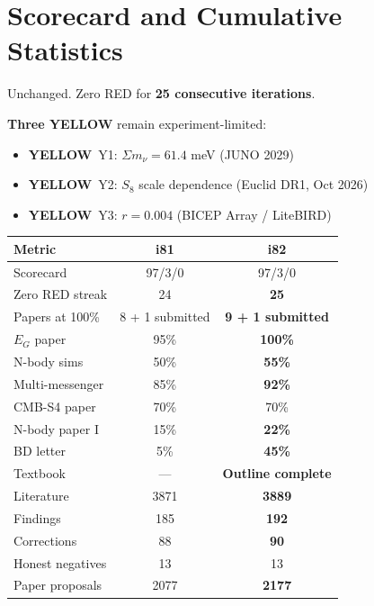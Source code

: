 \documentclass[11pt,a4paper]{article}
\newcommand{\YELLOW}{\textcolor{dfdyellow}{\textbf{YELLOW}}}
\begin{document}
\section{Scorecard and Cumulative Statistics}

\begin{tcolorbox}[colback=green!5!white, colframe=dfdgreen, title=\textbf{Scorecard: 97 GREEN / 3 YELLOW / 0 RED}]
Unchanged. Zero RED for \textbf{25 consecutive iterations}.

\textbf{Three YELLOW} remain experiment-limited:
\begin{itemize}[nosep]
\item \YELLOW\ Y1: $\Sigma m_\nu = 61.4$ meV (JUNO 2029)
\item \YELLOW\ Y2: $S_8$ scale dependence (Euclid DR1, Oct 2026)
\item \YELLOW\ Y3: $r = 0.004$ (BICEP Array / LiteBIRD)
\end{itemize}
\end{tcolorbox}

\begin{center}
\begin{tabular}{lcc}
\toprule
\textbf{Metric} & \textbf{i81} & \textbf{i82} \\
\midrule
Scorecard & 97/3/0 & 97/3/0 \\
Zero RED streak & 24 & \textbf{25} \\
Papers at 100\% & 8 + 1 submitted & \textbf{9 + 1 submitted} \\
$E_G$ paper & 95\% & \textbf{100\%} \\
N-body sims & 50\% & \textbf{55\%} \\
Multi-messenger & 85\% & \textbf{92\%} \\
CMB-S4 paper & 70\% & 70\% \\
N-body paper I & 15\% & \textbf{22\%} \\
BD letter & 5\% & \textbf{45\%} \\
Textbook & --- & \textbf{Outline complete} \\
Literature & 3871 & \textbf{3889} \\
Findings & 185 & \textbf{192} \\
Corrections & 88 & \textbf{90} \\
Honest negatives & 13 & 13 \\
Paper proposals & 2077 & \textbf{2177} \\
\bottomrule
\end{tabular}
\end{center}
\end{document}
